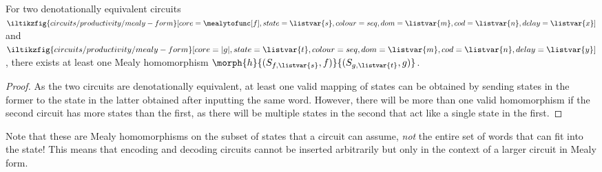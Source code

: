 \begin{proposition}
    For two denotationally equivalent circuits \(
    \iltikzfig{circuits/productivity/mealy-form}[core=\mealytofunc[f],state=\listvar{s},colour=seq,dom=\listvar{m},cod=\listvar{n},delay=\listvar{x}]
    \) and \(
    \iltikzfig{circuits/productivity/mealy-form}[core=|g|,state=\listvar{t},colour=seq,dom=\listvar{m},cod=\listvar{n},delay=\listvar{y}]
    \), there exists at least one Mealy homomorphism \(
    \morph{h}{(S_{f,\listvar{s}},f)}{(S_{g,\listvar{t}},g)}
    \).
\end{proposition}
\begin{proof}
    As the two circuits are denotationally equivalent, at least one valid
    mapping of states can be obtained by sending states in the former to the
    state in the latter obtained after inputting the same word.
    However, there will be more than one valid homomorphism if the second
    circuit has more states than the first, as there will be multiple states in
    the second that act like a single state in the first.
\end{proof}

Note that these are Mealy homomorphisms on the subset of states that a circuit
can assume, \emph{not} the entire set of words that can fit into the state!
This means that encoding and decoding circuits cannot be inserted arbitrarily
but only in the context of a larger circuit in Mealy form.

